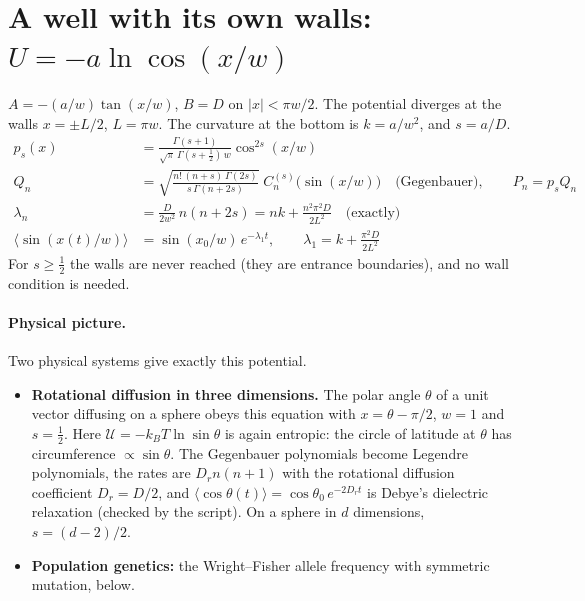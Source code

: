 \documentclass[11pt]{article}
\numberwithin{equation}{section}
\newcommand{\avg}[1]{\langle #1\rangle}
\begin{document}
\section{A well with its own walls: \texorpdfstring{$U=-a\ln\cos(x/w)$}{U = -a ln cos(x/w)}}
\label{sec:lncos}

\begin{keyresults}
$A=-(a/w)\tan(x/w)$, $B=D$ on $|x|<\pi w/2$. The potential diverges at the walls $x=\pm L/2$, $L=\pi w$. The
curvature at the bottom is $k=a/w^2$, and $s=a/D$.
\begin{align}
  p_s(x) &= \frac{\Gamma(s+1)}{\sqrt\pi\,\Gamma(s+\frac12)\,w}\cos^{2s}(x/w) \\
  Q_n &= \sqrt{\frac{n!\,(n+s)\,\Gamma(2s)}{s\,\Gamma(n+2s)}}\;C_n^{(s)}\bigl(\sin(x/w)\bigr)\quad\text{(Gegenbauer)},\qquad
  P_n=p_sQ_n \\
  \lambda_n &= \frac{D}{2w^2}\,n(n+2s)=nk+\frac{n^2\pi^2D}{2L^2}\quad\text{(exactly)} \\
  \avg{\sin(x(t)/w)} &= \sin(x_0/w)\,e^{-\lambda_1t},\qquad \lambda_1=k+\frac{\pi^2D}{2L^2}
\end{align}
For $s\ge\frac12$ the walls are never reached (they are entrance boundaries), and no wall condition is needed.
\end{keyresults}

\paragraph{Physical picture.} Two physical systems give exactly this potential.
\begin{itemize}
  \item \textbf{Rotational diffusion in three dimensions.} The polar angle $\theta$ of a unit vector diffusing on
        a sphere obeys this equation with $x=\theta-\pi/2$, $w=1$ and $s=\tfrac12$. Here
        $\mathcal U=-k_BT\ln\sin\theta$ is again entropic: the circle of latitude at $\theta$ has circumference
        $\propto\sin\theta$. The Gegenbauer polynomials become Legendre polynomials, the rates are $D_rn(n+1)$ with
        the rotational diffusion coefficient $D_r=D/2$, and $\avg{\cos\theta(t)}=\cos\theta_0\,e^{-2D_rt}$ is
        Debye's dielectric relaxation (checked by the script). On a sphere in $d$ dimensions, $s=(d-2)/2$.
  \item \textbf{Population genetics:} the Wright--Fisher allele frequency with symmetric mutation, below.
\end{itemize}
\end{document}
